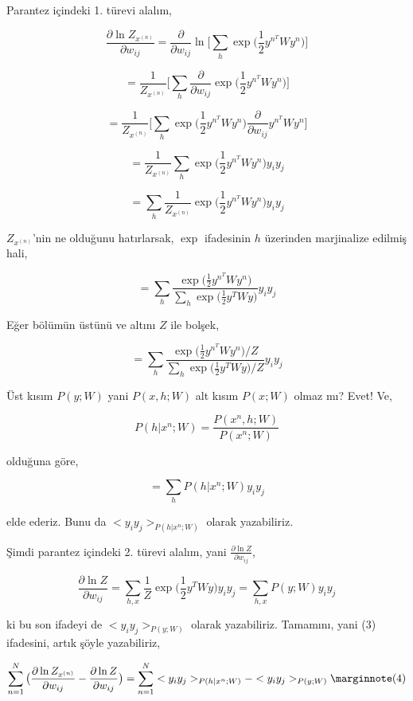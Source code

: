 \documentclass[12pt,fleqn]{article}\usepackage{../../common}
\begin{document}
Parantez içindeki 1. türevi alalım,

$$ 
\frac{\partial \ln Z_{x^{(n)}} }{\partial w_{ij}} = 
\frac{\partial }{\partial w_{ij}}  
\ln \bigg[ 
\sum_h \exp \big( \frac{1}{2} y^{n^T} W y^n \big) 
\bigg]
$$

$$ 
= \frac{1}{Z_{x^{(n)}}}  \bigg[ \sum_h \frac{\partial }{\partial w_{ij}} \exp \big( \frac{1}{2} y^{n^T} W y^n  \big) \bigg]
$$

$$ 
= \frac{1}{Z_{x^{(n)}}}  
\bigg[ 
\sum_h  \exp \big( \frac{1}{2} y^{n^T} W y^n  \big) 
\frac{\partial }{\partial w_{ij}} y^{n^T} W y^n 
\bigg]
$$

$$ 
= \frac{1}{Z_{x^{(n)}}}  \sum_h  \exp \big( \frac{1}{2} y^{n^T} W y^n  \big) y_iy_j
$$

$$ 
= \sum_h  \frac{1}{Z_{x^{(n)}}}  \exp \big( \frac{1}{2} y^{n^T} W y^n  \big) y_iy_j
$$

$Z_{x^{(n)}}$'nin ne olduğunu hatırlarsak, $\exp$ ifadesinin $h$ üzerinden
marjinalize edilmiş hali,

$$ 
= \sum_h  \frac{\exp \big( \frac{1}{2} y^{n^T} W y^n  \big)}
{\sum_h \exp \big( \frac{1}{2} y^T W y \big) } 
y_iy_j
$$

Eğer bölümün üstünü ve altını $Z$ ile bolşek,

$$ 
= \sum_h  
\frac{\exp \big( \frac{1}{2} y^{n^T} W y^n  \big) / Z} 
{\sum_h \exp \big( \frac{1}{2} y^T W y \big) / Z} 
y_iy_j
$$

Üst kısım $P(y;W)$ yani $P(x,h;W) $ alt kısım $P(x;W)$ olmaz mı? Evet! Ve,

$$ P(h|x^n;W) = \frac{P(x^n,h;W)}{P(x^n;W)}  $$

olduğuna göre, 

$$ =  \sum_h P(h|x^n;W) y_iy_j $$

elde ederiz. Bunu da $<y_iy_j>_{P(h|x^n;W)}$ olarak yazabiliriz. 

Şimdi parantez içindeki 2. türevi alalım, yani $\frac{\partial \ln Z }{\partial w_{ij}}$,

$$ 
\frac{\partial \ln Z }{\partial w_{ij}}  = 
\sum_{h,x} \frac{1}{Z}  \exp \big( \frac{1}{2} y^{T} W y  \big) y_iy_j =
\sum_{h,x} P(y;W)  y_iy_j
$$

ki bu son ifadeyi de $< y_iy_j >_{P(y;W)}$ olarak yazabiliriz. Tamamını,
yani (3) ifadesini, artık şöyle yazabiliriz,

$$
\sum_{n=1}^{N}  \big( \frac{\partial \ln Z_{x^{(n)}} }{\partial w_{ij}} - 
\frac{\partial \ln Z }{\partial w_{ij}} \big)
= \sum_{n=1}^{N}  < y_iy_j >_{P(h|x^n;W)} - < y_iy_j >_{P(y;W)}
\mlabel{4}
$$
\end{document}
